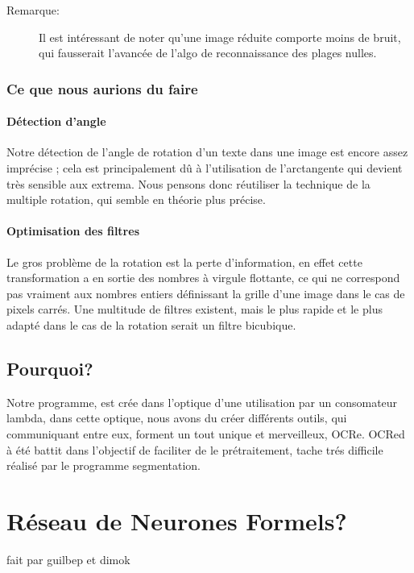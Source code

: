 \documentclass[a4paper,12pt]{report}
\begin{document}
\begin{description}
	\item[Remarque:] Il est int\'eressant de noter qu'une image r\'eduite comporte
	moins de bruit, qui fausserait l'avanc\'ee de l'algo de reconnaissance
	des plages nulles.
\end{description}

\subsection{ Ce que nous aurions du faire}
\subsubsection{ D\'etection d'angle}
Notre d\'etection de l'angle de rotation d'un texte dans une image est
encore assez impr\'ecise ; cela est principalement d\^u \`a l'utilisation
de l'arctangente qui devient tr\`es sensible aux extrema. Nous pensons
donc r\'eutiliser la technique de la multiple rotation, qui semble en
th\'eorie plus pr\'ecise.
\subsubsection{ Optimisation des filtres}
Le gros probl\`eme de la rotation est la perte d'information, en effet
cette transformation a en sortie des nombres \`a virgule flottante,
ce qui ne correspond pas vraiment aux nombres entiers d\'efinissant la
grille d'une image dans le cas de pixels carr\'es. Une multitude de
filtres existent, mais le plus rapide et le plus adapt\'e dans le cas de la
rotation serait un filtre bicubique.
\section{Pourquoi?}
Notre programme, est cr\'ee dans l'optique d'une utilisation par un
consomateur lambda, dans cette optique, nous avons du cr\'eer diff\'erents
outils, qui communiquant entre eux, forment un tout unique et
merveilleux, OCRe.
OCRed \`a \'et\'e battit dans l'objectif de faciliter de le
pr\'etraitement, tache tr\'es difficile r\'ealis\'e par le programme segmentation.


\chapter{ R\'eseau de Neurones Formels?}
fait par guilbep et dimok
\end{document}
